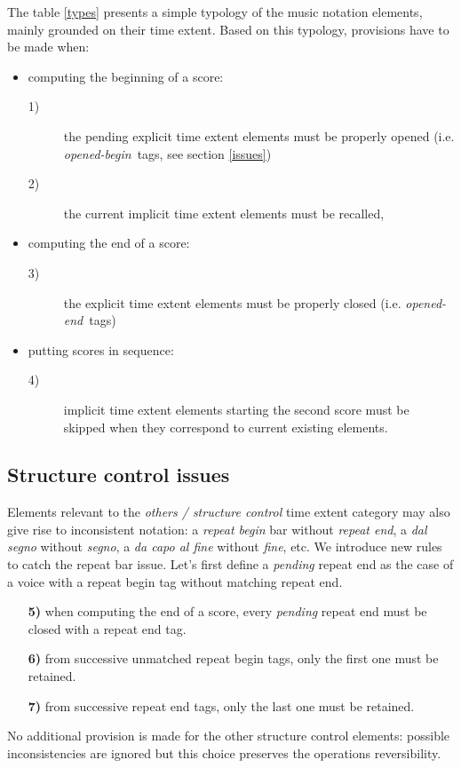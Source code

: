 \documentclass[twoside,10pt,a4paper]{article}
\newcommand{\rulenum}[1]	{\textbf{#1}}
\newcommand{\oend}			{\emph{opened-end}}
\newcommand{\obeg}			{\emph{opened-begin}}
\begin{document}
The table \ref{types} presents a simple typology of the music notation elements, mainly grounded on their time extent.
Based on this typology, provisions have to be made when:
\begin{itemize}
\item computing the beginning of a score:  
\begin{description}
	\item[1)] the pending explicit time extent elements must be properly opened (i.e. \obeg\ tags, see section \ref{issues})
	\item[2)] the current implicit time extent elements must be recalled,
\end{description}
\item computing the end of a score: 
\begin{description}
	\item[3)] the explicit time extent elements must be properly closed (i.e. \oend\ tags)
\end{description}
\item putting scores in sequence: 
\begin{description}
	\item[4)] implicit time extent elements starting the second score must be skipped when they correspond to current existing elements.
\end{description}
\end{itemize}

\subsection{Structure control issues} \label{sc}
Elements relevant to the \emph{others / structure control} time extent category may also give rise to inconsistent notation: a \emph{repeat begin} bar without \emph{repeat end}, a \emph{dal segno} without \emph{segno}, a \emph{da capo al fine} without \emph{fine}, etc. We introduce new rules to catch the repeat bar issue. Let's first define a \emph{pending} repeat end as the case of a voice with a repeat begin tag without matching repeat end.
\begin{itemize}
\item[\rulenum{5)}] when computing the end of a score, every \emph{pending} repeat end must be closed with a repeat end tag.
\item[\rulenum{6)}] from successive unmatched repeat begin tags, only the first one must be retained.
\item[\rulenum{7)}] from successive repeat end tags, only the last one must be retained.
\end{itemize}
No additional provision is made for the other structure control elements: possible inconsistencies are ignored but this choice preserves the operations reversibility.
\end{document}

